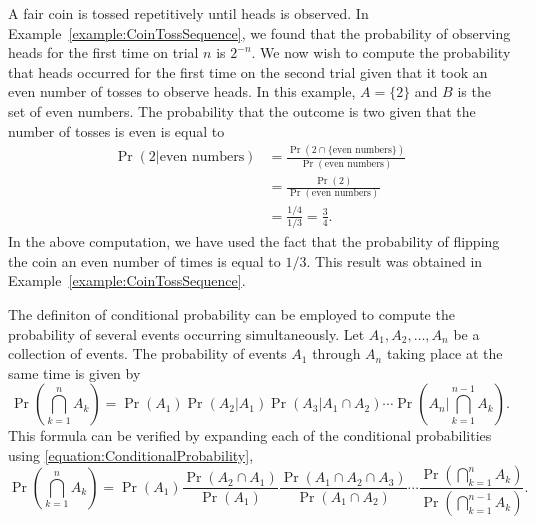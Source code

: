 \begin{example}
A fair coin is tossed repetitively until heads is observed.
In Example~\ref{example:CoinTossSequence}, we found that the probability of observing heads for the first time on trial $n$ is $2^{-n}$.
We now wish to compute the probability that heads occurred for the first time on the second trial given that it took an even number of tosses to observe heads.
In this example, $A = \{ 2 \}$ and $B$ is the set of even numbers.
The probability that the outcome is two given that the number of tosses is even is equal to
\begin{equation*}
\begin{split}
\Pr ( 2 | \text{even numbers} )
&= \frac{\Pr ( 2 \cap \{ \text{even numbers} \} )}
{\Pr (\text{even numbers})} \\
&= \frac{\Pr (2)}{\Pr (\text{even numbers})} \\
&= \frac{1/4}{1/3}
= \frac{3}{4} .
\end{split}
\end{equation*}
In the above computation, we have used the fact that the probability of flipping the coin an even number of times is equal to $1/3$.
This result was obtained in Example~\ref{example:CoinTossSequence}.
\end{example}

The definiton of conditional probability can be employed to compute the probability of several events occurring simultaneously.
Let $A_1, A_2, \ldots, A_n$ be a collection of events.
The probability of events $A_1$ through $A_n$ taking place at the same time is given by
\begin{equation} \label{equation:SimultaneousEvents}
\Pr \left( \bigcap_{k=1}^n A_k \right)
= \Pr (A_1) \Pr (A_2 | A_1) \Pr (A_3 | A_1 \cap A_2)
\cdots \Pr \left( A_n \bigg| \bigcap_{k=1}^{n-1} A_k \right) .
\end{equation}
This formula can be verified by expanding each of the conditional probabilities using \eqref{equation:ConditionalProbability},
\begin{equation*}
\Pr \left( \bigcap_{k=1}^n A_k \right)
= \Pr (A_1) \frac{\Pr (A_2 \cap A_1)}{\Pr (A_1)}
\frac{\Pr (A_1 \cap A_2 \cap A_3)}{\Pr (A_1 \cap A_2)}
\cdots \frac{\Pr \left( \bigcap_{k=1}^{n} A_k \right)}
{\Pr \left( \bigcap_{k=1}^{n-1} A_k \right)} .
\end{equation*}


